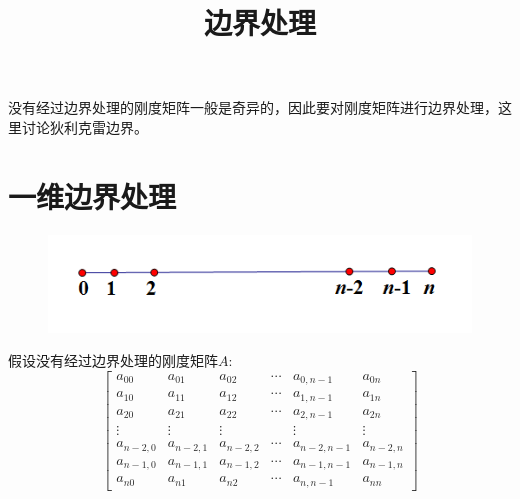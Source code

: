 \documentclass[12pt,a4paper]{article}
\title{边界处理}
\date{\chntoday}
\begin{document}
\maketitle
没有经过边界处理的刚度矩阵一般是奇异的，因此要对刚度矩阵进行边界处理，这里讨论狄利克雷边界。

\section{一维边界处理}

\begin{figure}[H]
\centering
\includegraphics[scale=0.5]{./figures/1.png}
\caption{}
\end{figure}

假设没有经过边界处理的刚度矩阵$A$:
$$
\begin{bmatrix}
a_{00} & a_{01} & a_{02} & \cdots & a_{0,n-1} & a_{0n} \\
a_{10} & a_{11} & a_{12} & \cdots & a_{1,n-1} & a_{1n} \\
a_{20} & a_{21} & a_{22} & \cdots & a_{2,n-1} & a_{2n} \\
\vdots & \vdots & \vdots &  & \vdots  & \vdots \\
a_{n-2,0} & a_{n-2,1} & a_{n-2,2} & \cdots & a_{n-2,n-1} & a_{n-2,n} \\
a_{n-1,0} & a_{n-1,1} & a_{n-1,2} & \cdots & a_{n-1,n-1} & a_{n-1,n} \\
a_{n0} & a_{n1} & a_{n2} & \cdots & a_{n,n-1} & a_{nn} 
\end{bmatrix}
$$
\end{document}
